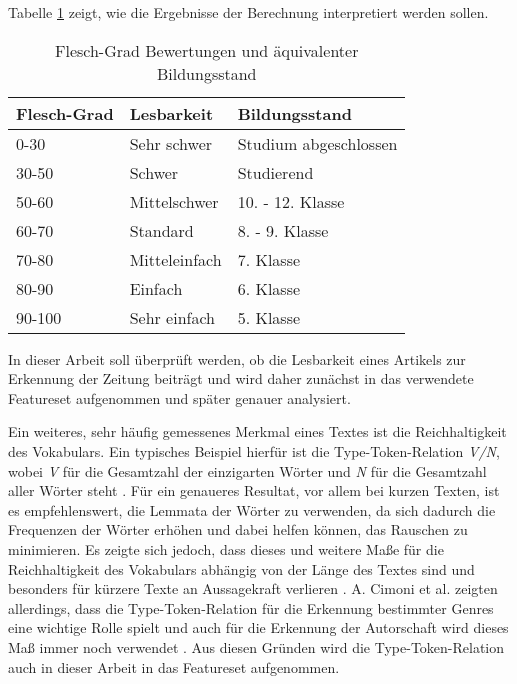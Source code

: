 Tabelle \ref{table.fleschgrad} zeigt, wie die Ergebnisse der Berechnung interpretiert werden sollen.

\begin{table}[h]
\centering
\begin{spacing}{1.25}
\begin{tabular}[t]{lll}
\toprule
Flesch-Grad & Lesbarkeit & Bildungsstand\\
\midrule
0-30 & Sehr schwer & Studium abgeschlossen\\
30-50 & Schwer & Studierend\\
50-60 & Mittelschwer & 10. - 12. Klasse\\
60-70 & Standard & 8. - 9. Klasse\\
70-80 & Mitteleinfach & 7. Klasse\\
80-90 & Einfach & 6. Klasse\\
90-100 & Sehr einfach & 5. Klasse\\
\bottomrule
\end{tabular}
\caption{Flesch-Grad Bewertungen und äquivalenter Bildungsstand \cite[S.~406]{courtis2002reading}}
\label{table.fleschgrad}
\end{spacing}
\end{table}

In dieser Arbeit soll überprüft werden, ob die Lesbarkeit eines Artikels zur Erkennung der Zeitung beiträgt und wird daher zunächst in das verwendete Featureset aufgenommen und später genauer analysiert.

Ein weiteres, sehr häufig gemessenes Merkmal eines Textes ist die Reichhaltigkeit des Vokabulars. Ein typisches Beispiel hierfür ist die Type-Token-Relation \textit{V/N}, wobei \textit{V} für die Gesamtzahl der einzigarten Wörter und \textit{N} für die Gesamtzahl aller Wörter steht \cite[S.~540]{stamatatos2009survey}. Für ein genaueres Resultat, vor allem bei kurzen Texten, ist es empfehlenswert, die Lemmata der Wörter zu verwenden, da sich dadurch die Frequenzen der Wörter erhöhen und dabei helfen können, das Rauschen zu minimieren. Es zeigte sich jedoch, dass dieses und weitere Maße für die Reichhaltigkeit des Vokabulars abhängig von der Länge des Textes sind und besonders für kürzere Texte an Aussagekraft verlieren \cite{tweedie1998variable}. A. Cimoni et al. zeigten allerdings, dass die Type-Token-Relation für die Erkennung bestimmter Genres eine wichtige Rolle spielt \cite[S.~5]{cimino2017identifying} und auch für die Erkennung der Autorschaft wird dieses Maß immer noch verwendet \cite[S.~540]{stamatatos2009survey}. Aus diesen Gründen wird die Type-Token-Relation auch in dieser Arbeit in das Featureset aufgenommen.


